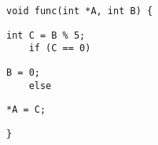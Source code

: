 \begin{lstlisting}[style=cppcode]
  void func(int *A, int B) {
\end{lstlisting}\vspace{-\baselineskip}

\begin{lstlisting}[style=cppcode, backgroundcolor=\color{green!15}, firstnumber=last]
    int C = B % 5;
    if (C == 0)
\end{lstlisting}\vspace{-\baselineskip}

\begin{lstlisting}[style=cppcode, firstnumber=last]
      B = 0;
    else
\end{lstlisting}\vspace{-\baselineskip}

\begin{lstlisting}[style=cppcode, backgroundcolor=\color{green!15}, firstnumber=last]
      *A = C;
\end{lstlisting}\vspace{-\baselineskip}

\begin{lstlisting}[style=cppcode, firstnumber=last]
  }
\end{lstlisting}\vspace{-\baselineskip}
